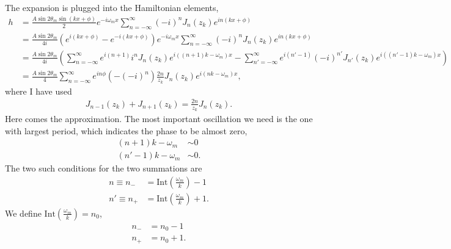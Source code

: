 \documentclass[letterpaper,12pt,english]{sphinxmanual}
\begin{document}
The expansion is plugged into the Hamiltonian elements,
\begin{equation*}
\begin{split}h &= \frac{A \sin 2\theta_m \sin (kx + \phi)}{2} e^{-i\omega_m x } \sum_{n = - \infty}^\infty (-i)^n J_n(z_k) e^{i n ( kx + \phi)} \\
& = \frac{A\sin 2\theta_m}{4i} \left( e^{i(kx + \phi)} - e^{-i(kx+\phi)} \right) e^{-i\omega_m x } \sum_{n = - \infty}^\infty (-i)^n J_n(z_k) e^{i n ( kx + \phi)} \\
& = \frac{A\sin 2\theta_m}{4i} \left( \sum_{n=-\infty}^\infty e^{i(n+1)} i^n J_n (z_k) e^{i((n+1) k - \omega_m)x}  - \sum_{n'=-\infty}^\infty e^{i(n'-1)} (-i)^{n'}J_{n'}(z_k) e^{i( (n'-1)k - \omega_m)x}  \right)\\
& = \frac{A\sin 2\theta_m}{4} \sum_{n=-\infty}^{\infty} e^{in\phi} \left( - (-i)^n \right) \frac{2n}{z_k} J_n (z_k) e^{i(nk-\omega_m)x},\end{split}
\end{equation*}
where I have used
\begin{equation*}
\begin{split}J_{n-1}(z_k) + J_{n+1}(z_k) = \frac{2n}{z_k} J_n(z_k).\end{split}
\end{equation*}
Here comes the approximation. The most important oscillation we need is the one with largest period, which indicates the phase to be almost zero,
\label{\detokenize{matter-stimulated/single-frequency:equation-single-frequency-rwa-requirement}}\begin{equation}\label{equation:matter-stimulated/single-frequency:single-frequency-rwa-requirement}
\begin{split}(n+1) k -\omega_m &\sim 0 \\
(n'-1) k -\omega_m &\sim 0.\end{split}
\end{equation}
The two such conditions for the two summations are
\begin{equation*}
\begin{split}n \equiv n_- &= \mathrm{Int}\left( \frac{\omega_m}{k} \right) - 1 \\
n' \equiv n_+ &= \mathrm{Int}\left( \frac{\omega_m}{k} \right) + 1 .\end{split}
\end{equation*}
We define \(\mathrm{Int}\left( \frac{\omega_m}{k} \right) = n_0\),
\begin{equation*}
\begin{split}n_- &= n_0 - 1 \\
n_+ &= n_0 + 1 .\end{split}
\end{equation*}
\end{document}
